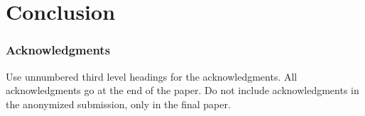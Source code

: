 \documentclass{article}
\begin{document}

\section{Conclusion}

\subsubsection*{Acknowledgments}
Use unnumbered third level headings for the acknowledgments. All
acknowledgments go at the end of the paper. Do not include
acknowledgments in the anonymized submission, only in the final paper.




\end{document}
